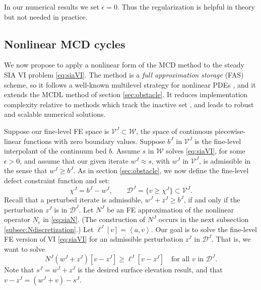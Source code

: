\documentclass[letterpaper,final,12pt,reqno]{amsart}
\theoremstyle{claim}
\newcommand{\eps}{\epsilon}
\newcommand{\ip}[2]{\left<#1,#2\right>}
\numberwithin{equation}{section}
\numberwithin{figure}{section}
\numberwithin{table}{section}
\numberwithin{theorem}{section}
\begin{document}
In our numerical results we set $\eps=0$.  Thus the regularization is helpful in theory but not needed in practice.

\subsection{Nonlinear MCD cycles} \label{subsec:mcdn}  We now propose to apply a nonlinear form of the MCD method to the steady SIA VI problem \eqref{eq:siaVI}.  The method is a \emph{full approximation storage} (FAS) scheme, so it follows a well-known multilevel strategy for nonlinear PDEs \cite{Briggsetal2000,Trottenbergetal2001}, and it extends the MCDL method of section \ref{sec:obstacle}.  It reduces implementation complexity relative to methods which track the inactive set \cite{Bueler2016,Jouvetetal2013,JouvetGraeser2013}, and leads to robust and scalable numerical solutions.

Suppose our fine-level FE space is $\mathcal{V}^J \subset \mathcal{W}$, the space of continuous piecewise-linear functions with zero boundary values.  Suppose $b^J$ in $\mathcal{V}^J$ is the fine-level interpolant of the continuum bed $b$.  Assume $s$ in $\mathcal{W}$ solves \eqref{eq:siaVI}, for some $\eps>0$, and assume that our given iterate $w^J\approx s$, with $w^J$ in $\mathcal{V}^J$, is admissible in the sense that $w^J \ge b^J$.  As in section \ref{sec:obstacle}, we now define the fine-level defect constraint function and set:
    $$\chi^J = b^J - w^J, \qquad \mathcal{D}^J = \{v\ge \chi^J\} \subset \mathcal{V}^J.$$
Recall that a perturbed iterate is admissible, $w^J + z^J \ge b^J$, if and only if the perturbation $z^J$ is in $\mathcal{D}^J$.  Let $N^J$ be an FE approximation of the nonlinear operator $N_\eps$ in \eqref{eq:siaN}.  (The construction of $N^J$ occurs in the next subsection \ref{subsec:Ndiscretization}.)  Let $\ell^J[v] = \ip{a}{v}$.  Our goal is to solve the fine-level FE version of VI \eqref{eq:siaVI} for an admissible perturbation $z^J$ in $\mathcal{D}^J$.  That is, we want to solve
\begin{equation}
N^J(w^J+z^J)[v-z^J] \ge \ell^J[v-z^J] \quad \text{for all $v$ in $\mathcal{D}^J$.} \label{eq:siaVIFEfinelevel}
\end{equation}
Note that $s^J=w^J+z^J$ is the desired surface elevation result, and that $v - z^J = (w^J+v)-s^J$.
\end{document}
